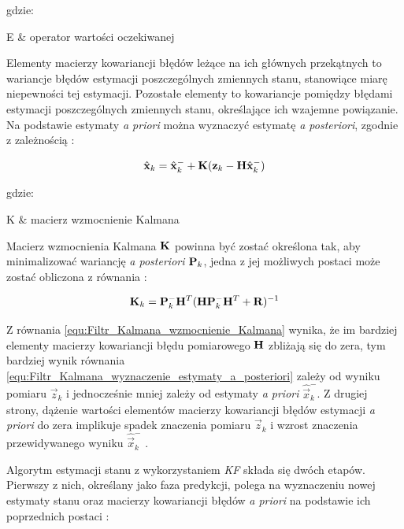 \noindent
gdzie:

\begin{conditions}
	E & operator wartości oczekiwanej \\
\end{conditions}

Elementy macierzy kowariancji błędów leżące na ich głównych przekątnych to wariancje błędów estymacji poszczególnych zmiennych stanu, stanowiące miarę niepewności tej estymacji. Pozostałe elementy to kowariancje pomiędzy błędami estymacji poszczególnych zmiennych stanu, określające ich wzajemne powiązanie. Na podstawie estymaty \textit{a priori} można wyznaczyć estymatę \textit{a posteriori}, zgodnie z zależnością \cite{Welch1995}:

\begin{equation}
\label{equ:Filtr_Kalmana_wyznaczenie_estymaty_a_posteriori}
	\hat{\vec{x}}_k = \hat{\vec{x}}_k^- + \matr{K}(\vec{z}_k - \matr{H}\hat{\vec{x}}_k^-)
\end{equation}

\noindent
gdzie:

\begin{conditions}
	K & macierz wzmocnienie Kalmana \\
\end{conditions}

Macierz wzmocnienia Kalmana $\mathbf{K}$ powinna być zostać określona tak, aby minimalizować wariancję \textit{a posteriori} $\mathbf{P}_k$, jedna z jej możliwych postaci może zostać obliczona z równania \cite{Welch1995}:

\begin{equation}
\label{equ:Filtr_Kalmana_wzmocnienie_Kalmana}
	\mathbf{K}_k = \mathbf{P}_k^- \mathbf{H}^T ( \mathbf{H} \mathbf{P}_k^- \mathbf{H}^T +\mathbf{R} ) ^ {-1}
\end{equation}

Z równania \ref{equ:Filtr_Kalmana_wzmocnienie_Kalmana} wynika, że im bardziej elementy macierzy kowariancji błędu pomiarowego $\mathbf{H}$ zbliżają się do zera, tym bardziej wynik równania \ref{equ:Filtr_Kalmana_wyznaczenie_estymaty_a_posteriori} zależy od wyniku pomiaru $\vec{z}_k$ i jednocześnie mniej zależy od estymaty \textit{a priori} $\hat{\vec{x}}_k^-$. Z drugiej strony, dążenie wartości elementów macierzy kowariancji błędów estymacji \textit{a priori} do zera implikuje spadek znaczenia pomiaru $\vec{z}_k$ i wzrost znaczenia przewidywanego wyniku $\hat{\vec{x}}_k^-$ \cite{Welch1995}.

Algorytm estymacji stanu z wykorzystaniem \textit{KF} składa się dwóch etapów. Pierwszy z nich, określany jako faza predykcji, polega na wyznaczeniu nowej estymaty stanu oraz macierzy kowariancji błędów \textit{a priori} na podstawie ich poprzednich postaci \cite{Welch1995}:

